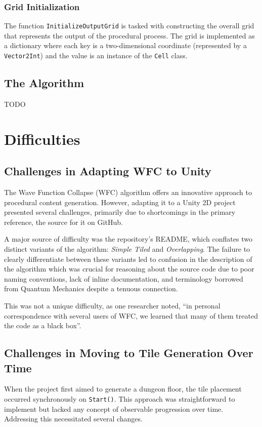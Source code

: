 \documentclass[a4paper, 12pt, one column, aas_macros]{article}
\begin{document}
\subsubsection{Grid Initialization}
The function \texttt{InitializeOutputGrid} is tasked with constructing the overall grid that represents the output of the procedural process. The grid is implemented as a dictionary where each key is a two-dimensional coordinate (represented by a \texttt{Vector2Int}) and the value is an instance of the \texttt{Cell} class.

\subsection{The Algorithm}
TODO


\section{Difficulties}
\subsection{Challenges in Adapting WFC to Unity}
The Wave Function Collapse (WFC) algorithm offers an innovative approach to procedural content generation. However, adapting it to a Unity 2D project presented several challenges, primarily due to shortcomings in the primary reference, the source for it on GitHub. \cite{mxgmn}

A major source of difficulty was the repository’s README, which conflates two distinct variants of the algorithm: \emph{Simple Tiled} and \emph{Overlapping}. The failure to clearly differentiate between these variants led to confusion in the description of the algorithm which was crucial for reasoning about the source code due to poor naming conventions, lack of inline documentation, and terminology borrowed from Quantum Mechanics despite a tenuous connection.

This was not a unique difficulty, as one researcher noted, ``in personal correspondence with several users of WFC, we learned that many of them treated the code as a black box''. \citep{karth}


\subsection{Challenges in Moving to Tile Generation Over Time}
When the project first aimed to generate a dungeon floor, the tile placement occurred synchronously on \texttt{Start()}. This approach was straightforward to implement but lacked any concept of observable progression over time. Addressing this necessitated several changes. 
\end{document}
